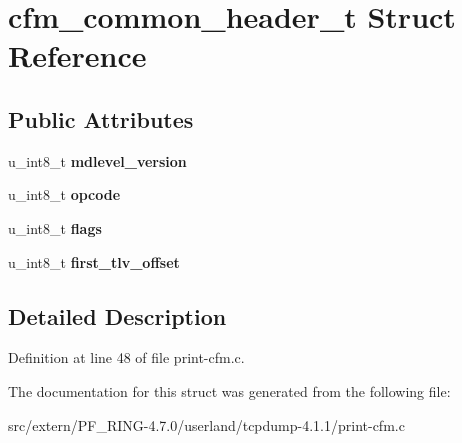 \hypertarget{structcfm__common__header__t}{
\section{cfm\_\-common\_\-header\_\-t Struct Reference}
\label{structcfm__common__header__t}
}
\subsection*{Public Attributes}
\begin{DoxyCompactItemize}
\item 
\hypertarget{structcfm__common__header__t_acecb170df29e085f6984ccb034b63608}{
u\_\-int8\_\-t {\bfseries mdlevel\_\-version}}
\label{structcfm__common__header__t_acecb170df29e085f6984ccb034b63608}

\item 
\hypertarget{structcfm__common__header__t_a92ddd2e9a9f48387a3be3e6bdcae3e9d}{
u\_\-int8\_\-t {\bfseries opcode}}
\label{structcfm__common__header__t_a92ddd2e9a9f48387a3be3e6bdcae3e9d}

\item 
\hypertarget{structcfm__common__header__t_a8b19b5c7df1588313233033edc67cca8}{
u\_\-int8\_\-t {\bfseries flags}}
\label{structcfm__common__header__t_a8b19b5c7df1588313233033edc67cca8}

\item 
\hypertarget{structcfm__common__header__t_aec0e61ae405aa0936f3054499b40858f}{
u\_\-int8\_\-t {\bfseries first\_\-tlv\_\-offset}}
\label{structcfm__common__header__t_aec0e61ae405aa0936f3054499b40858f}

\end{DoxyCompactItemize}


\subsection{Detailed Description}


Definition at line 48 of file print-\/cfm.c.



The documentation for this struct was generated from the following file:\begin{DoxyCompactItemize}
\item 
src/extern/PF\_\-RING-\/4.7.0/userland/tcpdump-\/4.1.1/print-\/cfm.c\end{DoxyCompactItemize}

